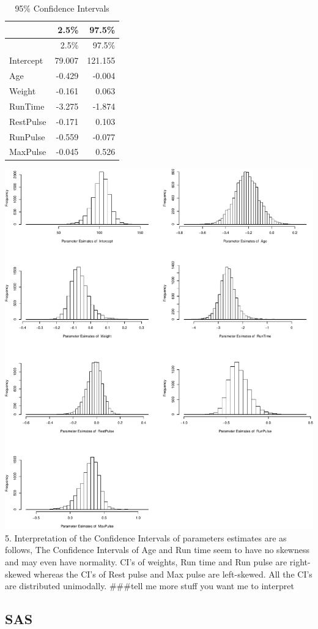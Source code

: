 \documentclass[]{article}
\begin{document}
\begin{longtable}[]{@{}lrr@{}}
\caption{95\% Confidence Intervals}\tabularnewline
\toprule
& 2.5\% & 97.5\%\tabularnewline
\midrule
\endfirsthead
\toprule
& 2.5\% & 97.5\%\tabularnewline
\midrule
\endhead
Intercept & 79.007 & 121.155\tabularnewline
Age & -0.429 & -0.004\tabularnewline
Weight & -0.161 & 0.063\tabularnewline
RunTime & -3.275 & -1.874\tabularnewline
RestPulse & -0.171 & 0.103\tabularnewline
RunPulse & -0.559 & -0.077\tabularnewline
MaxPulse & -0.045 & 0.526\tabularnewline
\bottomrule
\end{longtable}

\includegraphics{Report_files/figure-latex/rcode-1.pdf} 5.
Interpretation of the Confidence Intervals of parameters estimates are
as follows, The Confidence Intervals of Age and Run time seem to have no
skewness and may even have normality. CI's of weights, Run time and Run
pulse are right-skewed whereas the CI's of Rest pulse and Max pulse are
left-skewed. All the CI's are distributed unimodally. \#\#\#tell me more
stuff you want me to interpret

\pagebreak 

\subsection{SAS}\label{sas}
\end{document}
